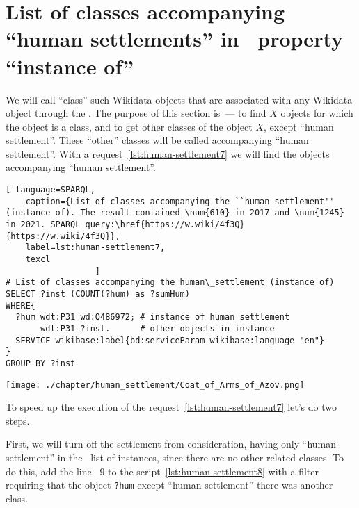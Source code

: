 \section{List of classes accompanying ``human settlements'' in ~property ``instance of''}
\label{human-settlement:tag1}

We will call ``class'' such Wikidata objects
that are associated with any Wikidata object through the .
The purpose of this section is~--- to find $X$ objects
for which the object  is a class,
and to get other classes of the object $X$, except ``human settlement''.
These ``other'' classes will be called accompanying ``human settlement''.
With a request~\ref{lst:human-settlement7}
we will find the objects accompanying ``human settlement''.

\begin{lstlisting}[ language=SPARQL,
    caption={List of classes accompanying the ``human settlement''  (instance of). The result contained \num{610} in 2017 and \num{1245} in 2021. SPARQL query:\href{https://w.wiki/4f3Q}{https://w.wiki/4f3Q}}, 
    label=lst:human-settlement7,
    texcl 
                  ]
# List of classes accompanying the human\_settlement (instance of)
SELECT ?inst (COUNT(?hum) as ?sumHum) 
WHERE{          
  ?hum wdt:P31 wd:Q486972; # instance of human settlement
       wdt:P31 ?inst.      # other objects in instance
  SERVICE wikibase:label{bd:serviceParam wikibase:language "en"}
}  
GROUP BY ?inst
\end{lstlisting}%

\begin{marginfigure} [0.0 cm]
{\texttt{[image: ./chapter/human\_settlement/Coat\_of\_Arms\_of\_Azov.png]}}
    \caption {The coat of arms of the ``human settlement''  of which country is depicted? \newline%
See~\protect\ref{answer:flag_human_settlements} on page~\protect\pageref{answer:flag_human_settlements}.}
    \label {fig:flag_question_human_settlements5}%
\end{marginfigure}

To speed up the execution of the request~\ref{lst:human-settlement7} let's do two steps.

First, we will turn off the settlement from consideration, 
having only ``human settlement'' in the ~list of instances,
since there are no other related classes. 
To do this, add the line ~\num{9} to the script~\ref{lst:human-settlement8} with a filter
requiring that the object \lstinline|?hum| 
except  ``human settlement'' there was another class.

